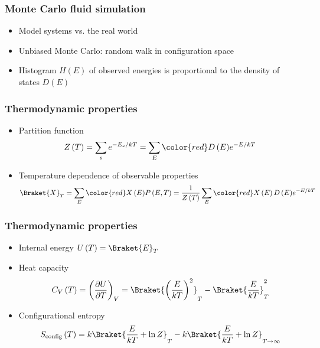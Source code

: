 \documentclass{beamer}
\newcommand{\bk}{\Braket} %
\newcommand{\p}[1]{\left(#1\right)} %
\newcommand{\f}[2]{\dfrac{#1}{#2}}
\renewcommand{\d}{\partial}
\let\olditem\item
\renewcommand{\item}{\setlength{\itemsep}{6pt}\olditem}
\begin{document}
\begin{frame}
  \frametitle{Monte Carlo fluid simulation}
  \begin{itemize}
  \item Model systems vs. the real world
  \item Unbiased Monte Carlo: random walk in configuration space
  \item Histogram $H\p{E}$ of observed energies is proportional to the
    density of states $D\p{E}$
  \end{itemize}
\end{frame}

\begin{frame}
  \frametitle{Thermodynamic properties}
  \begin{itemize}
  \item Partition function
    \begin{align*}
      Z\p{T}=\sum_se^{-E_s/kT}=\sum_E{\color{red}D\p{E}}e^{-E/kT}
    \end{align*}
  \item Temperature dependence of observable properties
    \begin{align*}
      \bk{X}_T=\sum_E{\color{red} X\p{E}}P\p{E,T}
      =\f1{Z\p{T}}\sum_E{\color{red}X\p{E}D\p{E}}e^{-E/kT}
    \end{align*}
  \end{itemize}
\end{frame}

\begin{frame}
  \frametitle{Thermodynamic properties}
  \begin{itemize}
  \item Internal energy $U\p{T}=\bk{E}_T$
  \item Heat capacity
    \begin{align*}
      C_V\p{T}=\p{\f{\d U}{\d T}}_V
      =\bk{\p{\f{E}{kT}}^2}_T-\bk{\f{E}{kT}}_T^2
    \end{align*}
  \item Configurational entropy
  \begin{align*}
    S_{\text{config}}\p{T} =k\bk{\f{E}{kT}+\ln Z}_T
    -k\bk{\f{E}{kT}+\ln Z}_{T\to\infty}
  \end{align*}

  \end{itemize}
\end{frame}
\end{document}
